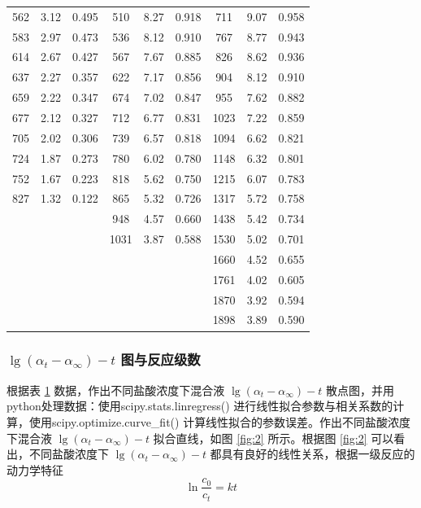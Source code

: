 \begin{table}[H]
\begin{tabular}{ccc|ccc|ccc}
        562 & 3.12 & 0.495 & 510 & 8.27 & 0.918 & 711 & 9.07 & 0.958 \\
        583 & 2.97 & 0.473 & 536 & 8.12 & 0.910 & 767 & 8.77 & 0.943 \\
        614 & 2.67 & 0.427 & 567 & 7.67 & 0.885 & 826 & 8.62 & 0.936 \\
        637 & 2.27 & 0.357 & 622 & 7.17 & 0.856 & 904 & 8.12 & 0.910 \\
        659 & 2.22 & 0.347 & 674 & 7.02 & 0.847 & 955 & 7.62 & 0.882 \\
        677 & 2.12 & 0.327 & 712 & 6.77 & 0.831 & 1023 & 7.22 & 0.859 \\
        705 & 2.02 & 0.306 & 739 & 6.57 & 0.818 & 1094 & 6.62 & 0.821 \\
        724 & 1.87 & 0.273 & 780 & 6.02 & 0.780 & 1148 & 6.32 & 0.801 \\
        752 & 1.67 & 0.223 & 818 & 5.62 & 0.750 & 1215 & 6.07 & 0.783 \\
        827 & 1.32 & 0.122 & 865 & 5.32 & 0.726 & 1317 & 5.72 & 0.758 \\
        \multicolumn{3}{c|}{\multirow{2}{*}{}} & 948 & 4.57 & 0.660 & 1438 & 5.42 & 0.734 \\
        \multicolumn{3}{c|}{} & 1031 & 3.87 & 0.588 & 1530 & 5.02 & 0.701 \\
        \multicolumn{3}{c|}{\multirow{4}{*}{}} & \multicolumn{3}{c|}{\multirow{4}{*}{}} & 1660 & 4.52 & 0.655 \\
        \multicolumn{3}{c|}{} & \multicolumn{3}{c|}{} & 1761 & 4.02 & 0.605 \\
        \multicolumn{3}{c|}{} & \multicolumn{3}{c|}{} & 1870 & 3.92 & 0.594 \\
        \multicolumn{3}{c|}{} & \multicolumn{3}{c|}{} & 1898 & 3.89 & 0.590 \\
        \bottomrule
        \end{tabular}
    \label{tab:4}
\end{table}

\subsubsection{$\lg \left(\alpha_t-\alpha_{\infty}\right)-t$ 图与反应级数}

根据表 \ref{tab:4} 数据，作出不同盐酸浓度下混合液 $\lg \left(\alpha_t-\alpha_{\infty}\right)-t$ 散点图，并用 python处理数据：使用scipy.stats.linregress() 进行线性拟合参数与相关系数的计算，使用scipy.optimize.curve\_fit() 计算线性拟合的参数误差。作出不同盐酸浓度下混合液 $\lg \left(\alpha_t-\alpha_{\infty}\right)-t$ 拟合直线，如图 \ref{fig:2} 所示。根据图 \ref{fig:2} 可以看出，不同盐酸浓度下 $\lg \left(\alpha_t-\alpha_{\infty}\right)-t$ 都具有良好的线性关系，根据一级反应的动力学特征
$$
\ln \frac{c_0}{c_t}=k t
$$


